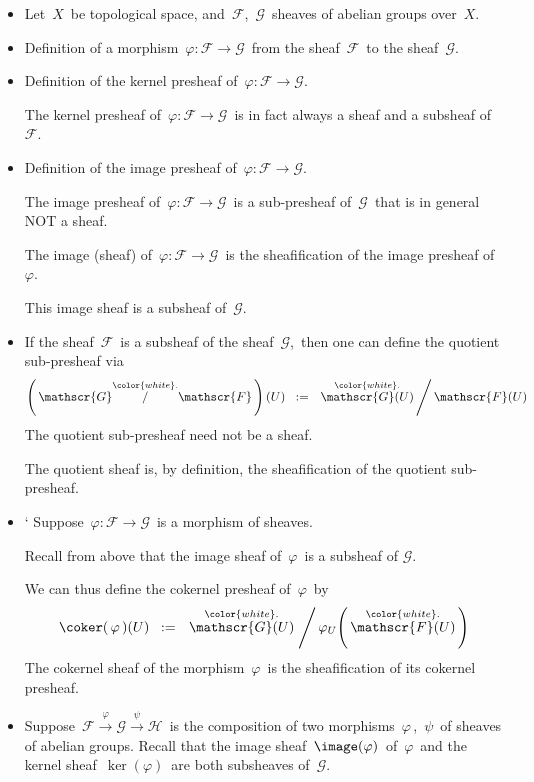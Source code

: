 \begin{itemize}
\item
	Let \,$X$\, be topological space, and \,$\mathscr{F}$,\, $\mathscr{G}$\, sheaves of abelian groups over \,$X$.\,
\item
	Definition of a morphism \,$\varphi : \mathscr{F} \longrightarrow \mathscr{G}$\,
	from the sheaf \,$\mathscr{F}$\, to the sheaf \,$\mathscr{G}$.\,
\item
	Definition of the kernel presheaf of \,$\varphi : \mathscr{F} \longrightarrow \mathscr{G}$.\,
	
	The kernel presheaf of
	\,$\varphi : \mathscr{F} \longrightarrow \mathscr{G}$\,
	is in fact always a sheaf and a subsheaf of
	\,$\mathscr{F}$.\,
\item
	Definition of the image presheaf of \,$\varphi : \mathscr{F} \longrightarrow \mathscr{G}$.\,
	
	The image presheaf of
	\,$\varphi : \mathscr{F} \longrightarrow \mathscr{G}$\,
	is a sub-presheaf of
	\,$\mathscr{G}$\,
	that is in general NOT a sheaf.

	The image (sheaf) of
	\,$\varphi : \mathscr{F} \longrightarrow \mathscr{G}$\,
	is the sheafification of the image presheaf of
	\,$\varphi$.\,

	This image sheaf is a subsheaf of
	\,$\mathscr{G}$.\,
\item
	If the sheaf \,$\mathscr{F}$\, is a subsheaf of the sheaf \,$\mathscr{G}$,\,
	then one can define the quotient sub-presheaf via
	\begin{equation*}
	\left(\,\mathscr{G} \overset{{\color{white}.}}{\slash} \mathscr{F}\,\right)(U)
	\;\; := \;\;
		\left. \overset{{\color{white}.}}{\mathscr{G}(U)} \,\right\slash\mathscr{F}(U)
	\end{equation*}
	The quotient sub-presheaf need not be a sheaf.
	
	The quotient sheaf is, by definition, the sheafification of the quotient sub-presheaf.
\item
`	Suppose
	\,$\varphi : \mathscr{F} \longrightarrow \mathscr{G}$\,
	is a morphism of sheaves.
	
	Recall from above that the image sheaf of \,$\varphi$\, is a subsheaf of $\mathscr{G}$.\,
	
	We can thus define the cokernel presheaf of \,$\varphi$\, by
	\begin{equation*}
	\coker(\,\varphi\,)(U)
	\;\; := \;\;
		\left. \overset{{\color{white}.}}{\mathscr{G}(U)} \;\right\slash \varphi_{U}\!\left(\,\overset{{\color{white}.}}{\mathscr{F}(U)}\,\right)
	\end{equation*}
	The cokernel sheaf of the morphism \,$\varphi$\, is the sheafification of its cokernel presheaf.
\item
	Suppose
	\,$\mathscr{F} \overset{\varphi}{\longrightarrow} \mathscr{G} \overset{\psi}{\longrightarrow} \mathscr{H}$\,
	is the composition of two morphisms
	\,$\varphi$\,, \,$\psi$\,
	of sheaves of abelian groups.
	Recall that the image sheaf \,$\image(\varphi)$\, of \,$\varphi$\, and the kernel sheaf \,$\ker(\varphi)$\,
	are both subsheaves of \,$\mathscr{G}$.\,
	

\end{itemize}
